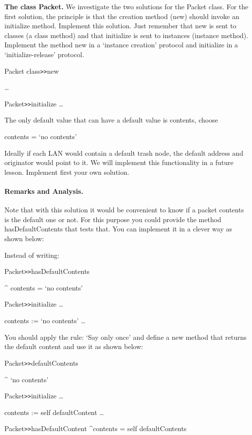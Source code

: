 \textbf{The class Packet.} 
We investigate the two solutions for the Packet class. For the 
first solution, the principle is that the creation method (new) 
should invoke an initialize method. Implement this solution. 
Just remember that new is sent to classes (a class method) and 
that initialize is sent to instances (instance method). Implement 
the method new in a `instance creation' protocol and initialize 
in a `initialize-release' protocol.

\begin{code}
Packet class\texttt{>>}new

\dots 

Packet\texttt{>>}initialize
   \dots 
\end{code}

The only default value that can have a default value is contents, 
choose 

\begin{code}
contents = `no contents'
\end{code} 


Ideally if each LAN would contain a default trash node, the default 
address and originator would point to it. We will implement this 
functionality in a future lesson. Implement first your own solution. 


\paragraph{Remarks and Analysis.} Note that with this solution it would 
be convenient to know if a packet contents is the default one 
or not. For this purpose you could provide the method hasDefaultContents 
that tests that. You can implement it in a clever way as shown 
below:

Instead of writing:

\begin{code}
Packet\texttt{>>}hasDefaultContents
 
 ^ contents = `no contents'

Packet\texttt{>>}initialize
 \dots 

contents := `no contents'
\dots 
\end{code}

You should apply the rule: `Say only once' and define a new method 
that returns the default content and use it as shown below:

\begin{code}
Packet\texttt{>>}defaultContents

    ^ `no contents'

Packet\texttt{>>}initialize
    \dots 

    contents := self defaultContent
    \dots 

Packet\texttt{>>}hasDefaultContent
    ^contents = self defaultContents
\end{code}

